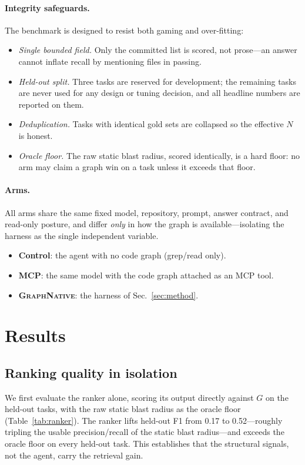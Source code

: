 \documentclass[11pt,twocolumn]{article}
\newcommand{\sys}{{\normalfont\scshape GraphNative}}
\begin{document}
\paragraph{Integrity safeguards.} The benchmark is designed to resist both gaming and
over-fitting:
\begin{itemize}
  \item \emph{Single bounded field.} Only the committed list is scored, not prose---an answer
  cannot inflate recall by mentioning files in passing.
  \item \emph{Held-out split.} Three tasks are reserved for development; the remaining tasks are
  never used for any design or tuning decision, and all headline numbers are reported on them.
  \item \emph{Deduplication.} Tasks with identical gold sets are collapsed so the effective $N$ is
  honest.
  \item \emph{Oracle floor.} The raw static blast radius, scored identically, is a hard floor: no
  arm may claim a graph win on a task unless it exceeds that floor.
\end{itemize}

\paragraph{Arms.} All arms share the same fixed model, repository, prompt, answer contract, and
read-only posture, and differ \emph{only} in how the graph is available---isolating the harness
as the single independent variable.
\begin{itemize}
  \item \textbf{Control}: the agent with no code graph (grep/read only).
  \item \textbf{MCP}: the same model with the code graph attached as an MCP tool.
  \item \textbf{\sys{}}: the harness of Sec.~\ref{sec:method}.
\end{itemize}

\section{Results}\label{sec:results}

\subsection{Ranking quality in isolation}
We first evaluate the ranker alone, scoring its output directly against $G$ on the held-out
tasks, with the raw static blast radius as the oracle floor (Table~\ref{tab:ranker}). The ranker
lifts held-out F1 from 0.17 to 0.52---roughly tripling the usable precision/recall of the static
blast radius---and exceeds the oracle floor on every held-out task. This establishes that the
structural signals, not the agent, carry the retrieval gain.
\end{document}
